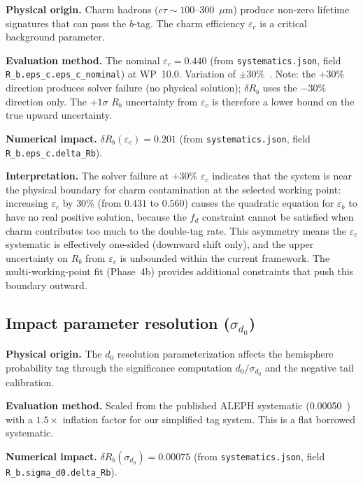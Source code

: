 \documentclass[11pt,a4paper]{article}
\begin{document}
\textbf{Physical origin.} Charm hadrons ($c\tau \sim 100$--300~$\mu$m) produce
non-zero lifetime signatures that can pass the $b$-tag. The charm efficiency
$\varepsilon_c$ is a critical background parameter.

\textbf{Evaluation method.} The nominal $\varepsilon_c = 0.440$
(from \texttt{systematics.json}, field \texttt{R\_b.eps\_c.eps\_c\_nominal})
at WP~10.0. Variation of $\pm 30\%$~\cite{LEP:HF:2001}. Note: the $+30\%$ direction
produces solver failure (no physical solution); $\delta R_b$ uses the $-30\%$ direction
only. The $+1\sigma$ $R_b$ uncertainty from $\varepsilon_c$ is therefore a lower bound
on the true upward uncertainty.

\textbf{Numerical impact.}
$\delta R_b(\varepsilon_c) = 0.201$
(from \texttt{systematics.json}, field \texttt{R\_b.eps\_c.delta\_Rb}).

\textbf{Interpretation.} The solver failure at $+30\%$ $\varepsilon_c$ indicates
that the system is near the physical boundary for charm contamination at the
selected working point: increasing $\varepsilon_c$ by $30\%$ (from $0.431$ to
$0.560$) causes the quadratic equation for $\varepsilon_b$ to have no real
positive solution, because the $f_d$ constraint cannot be satisfied when charm
contributes too much to the double-tag rate. This asymmetry means the
$\varepsilon_c$ systematic is effectively one-sided (downward shift only), and
the upper uncertainty on $R_b$ from $\varepsilon_c$ is unbounded within the
current framework. The multi-working-point fit (Phase~4b) provides additional
constraints that push this boundary outward.

\subsection{Impact parameter resolution ($\sigma_{d_0}$)}
\label{sec:syst_sigma_d0}

\textbf{Physical origin.} The $d_0$ resolution parameterization affects the hemisphere
probability tag through the significance computation $d_0/\sigma_{d_0}$ and the negative
tail calibration.

\textbf{Evaluation method.} Scaled from the published ALEPH systematic
(0.00050~\cite{ALEPH:Rb:1996}) with a $1.5\times$ inflation factor for our simplified
tag system. This is a flat borrowed systematic.

\textbf{Numerical impact.}
$\delta R_b(\sigma_{d_0}) = 0.00075$
(from \texttt{systematics.json}, field \texttt{R\_b.sigma\_d0.delta\_Rb}).
\end{document}
